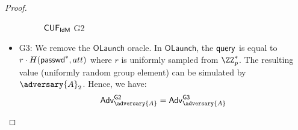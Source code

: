 \begin{proof}
\begin{itemize}
\begin{figure*}
{{\begin{pchstack}[center, space=0.2cm, boxed]
\begin{pcvstack}
    \end{pcvstack}
    \begin{pcvstack}
    \end{pcvstack}
    \end{pchstack}
}}
\caption{$\mathsf{CUF}_{\textsf{IdM}}$ \textsf{G2}}
\label{game:cuf_idmg2}
\end{figure*}

        \item \textsf{G3}: We remove the $\mathsf{OLaunch}$ oracle. In $\mathsf{OLaunch}$, the $\mathsf{query}$ is equal to $r\cdot H(\textsf{passwd}^*, att)$ where $r$ is uniformly sampled from $\ZZ_p^*$. The resulting value (uniformly random group element) can be simulated by $\adversary{A}_2$. Hence, we have:
        \begin{align*}
            \advtg_\adversary{A}^{\mathsf{G2}} = \advtg_\adversary{A}^{\mathsf{G3}} 
        \end{align*}


\end{itemize}
\end{proof}
